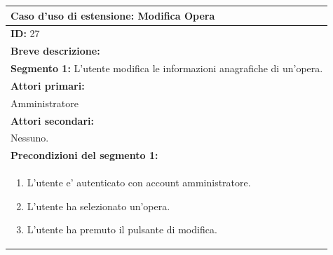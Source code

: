 \documentclass{article}
\begin{document}
                \begin{table}[H]
                    \begin{tabular}{|p{\linewidth}|}
                        \hline
                        \cellcolor{gray!100}
                        \color{white}
                        \centerline{\textbf{Caso d'uso di estensione:} Modifica Opera} \\
                        \hline
                        \textbf{ID:} 27 \\
                        \hline
                        \cellcolor{gray!20}
                        \textbf{Breve descrizione:} \\
                        \cellcolor{gray!20}
                        \textbf{Segmento 1:} L'utente modifica le informazioni anagrafiche di un'opera. \\
                        \hline
                        \textbf{Attori primari:} \\
                        \begin{minipage}{\linewidth}
                            Amministratore
                        \end{minipage}
                        \vspace{-10pt} \\  %
                        \hline
                        \textbf{Attori secondari:} \\
                        Nessuno. \\
                        \hline
                        \cellcolor{gray!20}
                        \textbf{Precondizioni del segmento 1:} \\
                        \cellcolor{gray!20}
                        \begin{minipage}{\linewidth}
                            \begin{enumerate}
                                \item L'utente e' autenticato con account amministratore.
                                \item L'utente ha selezionato un'opera.
                                \item L'utente ha premuto il pulsante di modifica.
                            \end{enumerate}
                        \end{minipage} \\

\end{tabular}
\end{table}
\end{document}
